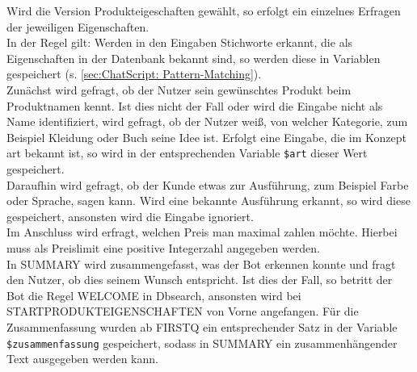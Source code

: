 Wird die Version Produkteigeschaften gewählt, so erfolgt ein einzelnes Erfragen der jeweiligen Eigenschaften.\\
In der Regel gilt: Werden in den Eingaben Stichworte erkannt, die als Eigenschaften in der Datenbank bekannt sind, so werden diese in Variablen gespeichert (s. \ref{sec:ChatScript: Pattern-Matching}).\\
Zunächst wird gefragt, ob der Nutzer sein gewünschtes Produkt beim Produktnamen kennt. Ist dies nicht der Fall oder wird die Eingabe nicht als Name identifiziert, wird gefragt, ob der Nutzer weiß, von welcher Kategorie, zum Beispiel Kleidung oder Buch seine Idee ist. Erfolgt eine Eingabe, die im Konzept \texttildelow art bekannt ist, so wird in der entsprechenden Variable \lstinline|$art| dieser Wert gespeichert.\\
Daraufhin wird gefragt, ob der Kunde etwas zur Ausführung, zum Beispiel Farbe oder Sprache, sagen kann. Wird eine bekannte Ausführung erkannt, so wird diese gespeichert, ansonsten wird die Eingabe ignoriert.\\
Im Anschluss wird erfragt, welchen Preis man maximal zahlen möchte. Hierbei muss als Preislimit eine positive Integerzahl angegeben werden.\\ 
In SUMMARY wird zusammengefasst, was der Bot erkennen konnte und fragt den Nutzer, ob dies seinem Wunsch entspricht. Ist dies der Fall, so betritt der Bot die Regel WELCOME in Dbsearch, ansonsten wird bei STARTPRODUKTEIGENSCHAFTEN von Vorne angefangen. Für die Zusammenfassung wurden ab FIRSTQ ein entsprechender Satz in der Variable \lstinline|$zusammenfassung| gespeichert, sodass in SUMMARY ein zusammenhängender Text ausgegeben werden kann.




